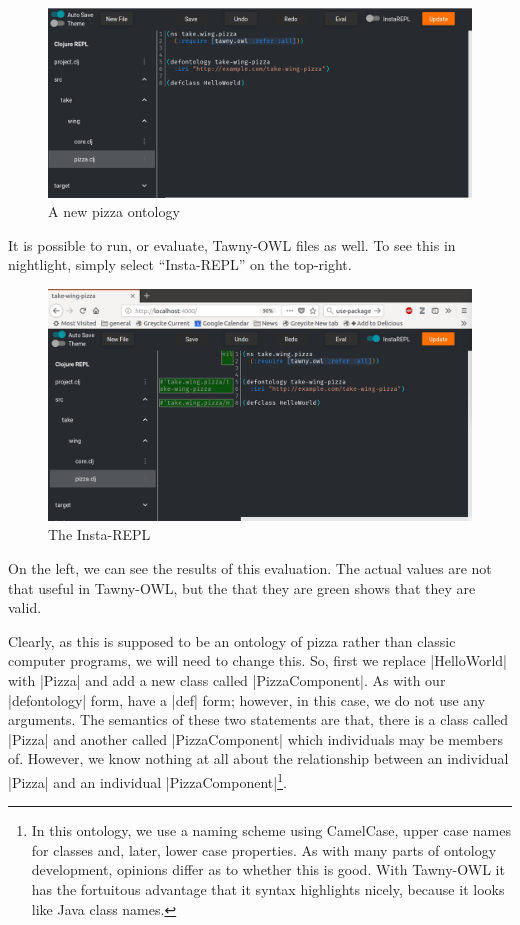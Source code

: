 \begin{figure}
  \centering
  \includegraphics[width=\textwidth]{images/night-pizza.png}
  \caption{A new pizza ontology}
  \label{fig:nightlight-pizza}
\end{figure}

It is possible to run, or evaluate, Tawny-OWL files as well. To see
this in nightlight, simply select ``Insta-REPL'' on the top-right.

\begin{figure}
  \centering
  \includegraphics[width=\textwidth]{images/night-instarepl.png}
  \caption{The Insta-REPL}
  \label{fig:nightlight-pizza}
\end{figure}

On the left, we can see the results of this evaluation. The actual
values are not that useful in Tawny-OWL, but the that they are green
shows that they are valid.

Clearly, as this is supposed to be an ontology of pizza rather than
classic computer programs, we will need to change this. So, first we
replace |HelloWorld| with |Pizza| and add a new class called
|PizzaComponent|.  As with our |defontology| form, have a |def| form;
however, in this case, we do not use any arguments. The semantics of
these two statements are that, there is a class called |Pizza| and
another called |PizzaComponent| which individuals may be members of.
However, we know nothing at all about the relationship between an
individual |Pizza| and an individual |PizzaComponent|\footnote{In this
  ontology, we use a naming scheme using CamelCase, upper case names
  for classes and, later, lower case properties. As with many parts of
  ontology development, opinions differ as to whether this is
  good. With Tawny-OWL it has the fortuitous advantage that it syntax
  highlights nicely, because it looks like Java class names.}.

